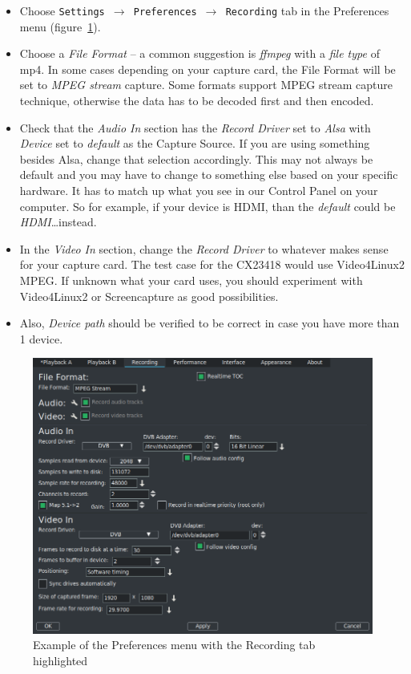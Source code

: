 \begin{itemize}
    \item Choose \texttt{Settings $\rightarrow$ Preferences $\rightarrow$ Recording} tab in the Preferences menu (figure~\ref{fig:recordingx}).
    \item Choose a \textit{File Format} -- a common suggestion is \textit{ffmpeg} with a \textit{file type} of mp4.  In some cases depending on your capture card, the File Format will be set to \textit{MPEG stream} capture. Some formats support MPEG stream capture technique, otherwise the data has to be decoded first and then encoded.
    \item Check that the \textit{Audio In} section has the \textit{Record Driver} set to \textit{Alsa} with \textit{Device} set to \textit{default} as the Capture Source.  If you are using something besides Alsa, change that selection accordingly. This may not always be default and you may have to change to something else based on your specific hardware. It has to match up what you see in our Control Panel on your computer. So for example, if your device is HDMI, than the \textit{default} could be \textit{HDMI}\dots instead.
    \item In the \textit{Video In} section, change the\textit{ Record Driver} to whatever makes sense for your capture card. The test case for the CX23418 would use Video4Linux2 MPEG. If unknown what your card uses, you should experiment with Video4Linux2 or Screencapture as good possibilities.
    \item Also, \textit{Device path} should be verified to be correct in case you have more than 1 device.
\end{itemize}

\begin{figure}[htpb]
    \centering
    \includegraphics[width=0.9\linewidth]{images/recording03.png}
    \caption{Example of the Preferences menu with the Recording tab highlighted}
    \label{fig:recordingx}
\end{figure}

